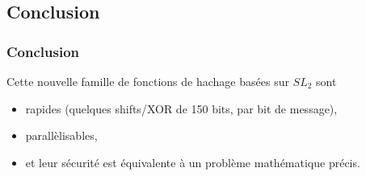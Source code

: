 \documentclass{beamer}
\begin{document}
\subsection{Conclusion}

\begin{frame}
 \frametitle{Conclusion}
 Cette nouvelle famille de fonctions de hachage basées sur $SL_2$ sont
 \begin{itemize}
  \item rapides (quelques shifts/XOR de 150 bits, par bit de message),
  \item parallèlisables,
  \item et leur sécurité est équivalente à un problème mathématique précis.
 \end{itemize}
\end{frame}
\end{document}
